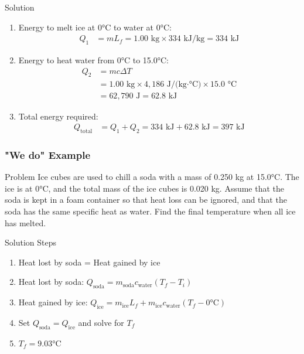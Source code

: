 \documentclass{beamer}
\begin{document}
\begin{frame}
    \begin{exampleblock}{Solution}
        \begin{enumerate}
            \item Energy to melt ice at 0°C to water at 0°C:
            \begin{align*}
                Q_1 &= mL_f = 1.00 \text{ kg} \times 334 \text{ kJ/kg} = 334 \text{ kJ}
            \end{align*}
            
            \item Energy to heat water from 0°C to 15.0°C:
            \begin{align*}
                Q_2 &= mc\Delta T\\
                &= 1.00 \text{ kg} \times 4,186 \text{ J/(kg·°C)} \times 15.0 \text{ °C}\\
                &= 62,790 \text{ J} = 62.8 \text{ kJ}
            \end{align*}
            
            \item Total energy required:
            \begin{align*}
                Q_{\text{total}} &= Q_1 + Q_2 = 334 \text{ kJ} + 62.8 \text{ kJ} = 397 \text{ kJ}
            \end{align*}
        \end{enumerate}
    \end{exampleblock}
\end{frame}

\begin{frame}
    \frametitle{"We do" Example}
    \begin{block}{Problem}
        Ice cubes are used to chill a soda with a mass of 0.250 kg at 15.0°C. The ice is at 0°C, and the total mass of the ice cubes is 0.020 kg. Assume that the soda is kept in a foam container so that heat loss can be ignored, and that the soda has the same specific heat as water. Find the final temperature when all ice has melted.
    \end{block}
    
    \begin{exampleblock}{Solution Steps}
        \begin{enumerate}
            \item Heat lost by soda = Heat gained by ice
            \item Heat lost by soda: $Q_{\text{soda}} = m_{\text{soda}}c_{\text{water}}(T_f - T_i)$
            \item Heat gained by ice: $Q_{\text{ice}} = m_{\text{ice}}L_f + m_{\text{ice}}c_{\text{water}}(T_f - 0\text{°C})$
            \item Set $Q_{\text{soda}} = Q_{\text{ice}}$ and solve for $T_f$
            \item $T_f = 9.03\text{°C}$
        \end{enumerate}
    \end{exampleblock}
    
\end{frame}
\end{document}
